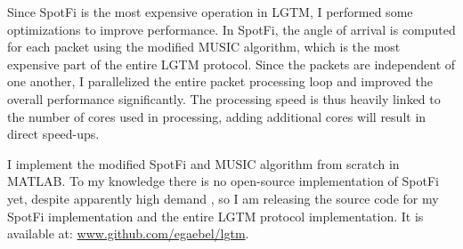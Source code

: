 \documentclass[12pt]{report}
\begin{document}
Since SpotFi is the most expensive operation in LGTM, I performed some optimizations to improve performance. In SpotFi, the angle of arrival is computed for each packet using the modified MUSIC algorithm, which is the most expensive part of the entire LGTM protocol. Since the packets are independent of one another, I parallelized the entire packet processing loop and improved the overall performance significantly. The processing speed is thus heavily linked to the number of cores used in processing, adding additional cores will result in direct speed-ups. \par

I implement the modified SpotFi and MUSIC algorithm from scratch in MATLAB. To my knowledge there is no open-source implementation of SpotFi yet, despite apparently high demand \cite{SpotFiCsiToolIssue2016}, so I am releasing the source code for my SpotFi implementation and the entire LGTM protocol implementation. It is available at: \url{www.github.com/egaebel/lgtm}. \par
\end{document}
